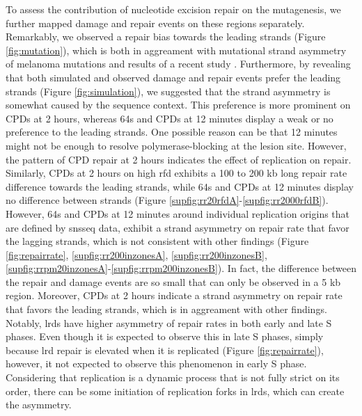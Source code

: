 To assess the contribution of nucleotide excision repair on the mutagenesis, we further mapped damage and repair events on these regions separately. Remarkably, we observed a repair bias towards the leading strands (Figure \ref{fig:mutation}), which is both in aggreament with mutational strand asymmetry of melanoma mutations and results of a recent study \citep{seplyarskiy2019error}. Furthermore, by revealing that both simulated and observed damage and repair events prefer the leading strands (Figure \ref{fig:simulation}), we suggested that the strand asymmetry is somewhat caused by the sequence context. This preference is more prominent on \gls{CPD}s at 2 hours, whereas \gls{64}s and \gls{CPD}s at 12 minutes display a weak or no preference to the leading strands. One possible reason can be that 12 minutes might not be enough to resolve polymerase-blocking at the lesion site. However, the pattern of \gls{CPD} repair at 2 hours indicates the effect of replication on repair. Similarly, \gls{CPD}s at 2 hours on high \gls{rfd} exhibits a 100 to 200 \gls{kb} long repair rate difference towards the leading strands, while \gls{64}s and \gls{CPD}s at 12 minutes display no difference between strands (Figure \ref{supfig:rr20rfdA}-\ref{supfig:rr2000rfdB}). However, \gls{64}s and \gls{CPD}s at 12 minutes around individual replication origins that are defined by \gls{snsseq} data, exhibit a strand asymmetry on repair rate that favor the lagging strands, which is not consistent with other findings (Figure \ref{fig:repairrate}, \ref{supfig:rr200inzonesA}, \ref{supfig:rr200inzonesB}, \ref{supfig:rrpm20inzonesA}-\ref{supfig:rrpm200inzonesB}). In fact, the difference between the repair and damage events are so small that can only be observed in a 5 kb region. Moreover, \gls{CPD}s at 2 hours indicate a strand asymmetry on repair rate that favors the leading strands, which is in aggreament with other findings. Notably, \gls{lrd}s have higher asymmetry of repair rates in both early and late S phases. Even though it is expected to observe this in late S phases, simply because \gls{lrd} repair is elevated when it is replicated (Figure \ref{fig:repairrate}), however, it not expected to observe this phenomenon in early S phase. Considering that replication is a dynamic process that is not fully strict on its order, there can be some initiation of replication forks in \gls{lrd}s, which can create the asymmetry.         

